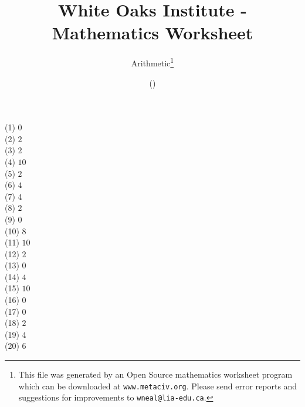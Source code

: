 \documentclass[letter]{article}
\begin{document}
\title{White Oaks Institute - Mathematics Worksheet}
\author{Arithmetic\thanks{This file was generated by an \textsf{Open Source} mathematics worksheet program which can be downloaded at \texttt{www.metaciv.org}. Please send error reports and suggestions for improvements to \texttt{wneal@lia-edu.ca}.}}
\date{\XCfileversion{} (\XCfiledate)}
\maketitle
\begin{multicols}{2}(1) $0$\\(2) $2$\\(3) $2$\\(4) $10$\\(5) $2$\\(6) $4$\\(7) $4$\\(8) $2$\\(9) $0$\\(10) $8$\\(11) $10$\\(12) $2$\\(13) $0$\\(14) $4$\\(15) $10$\\(16) $0$\\(17) $0$\\(18) $2$\\(19) $4$\\(20) $6$\end{multicols}
\end{document}
